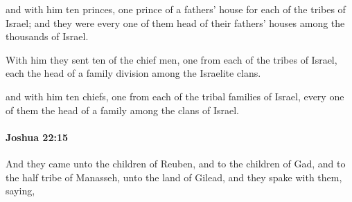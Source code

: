 			\begin{versebox}
					\item[BHS] 
					\item[ASV] and with him ten princes, one prince of a fathers' house for each of the tribes of Israel; and they were every one of them head of their fathers' houses among the thousands of Israel.
					\item[NIV] With him they sent ten of the chief men, one from each of the tribes of Israel, each the head of a family division among the Israelite clans.
					\item[NRSV] and with him ten chiefs, one from each of the tribal families of Israel, every one of them the head of a family among the clans of Israel.
			\end{versebox}

		\paragraph{Joshua 22:15} %
			\label{JOSHUA-22-15}

			And they came unto the children of Reuben, and to the children of Gad, and to the half tribe of Manasseh, unto the land of Gilead, and they spake with them, saying,

